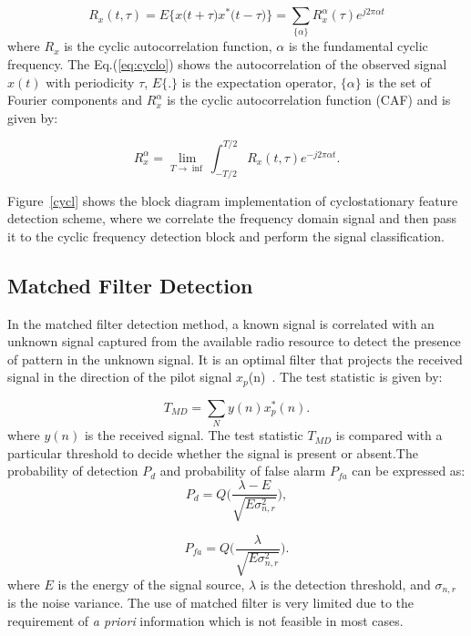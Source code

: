 \begin{equation}
\label{eq:cyclo}
R_x(t,\tau) = E\Bigg\{x\bigg(t+\tau \bigg)x^*\bigg(t-\tau \bigg)\Bigg\} = \sum_{\{\alpha\}} R_x^{\alpha}(\tau)e^{j2\pi\alpha t}
\end{equation}
where $R_x$ is the cyclic autocorrelation function, $\alpha$ is the fundamental cyclic frequency.
The Eq.(\ref{eq:cyclo}) shows the autocorrelation of the observed signal $x(t)$ with periodicity $\tau$, $E\{.\}$ is the expectation operator, $\{\alpha\}$ is the set of Fourier components and $R_x^{\alpha}$ is the cyclic autocorrelation function (CAF) and is given by:

\begin{equation}
R_x^{\alpha} = \lim_{T\rightarrow \inf}\int_{-T/2}^{T/2} R_x(t,\tau)e^{-j2\pi\alpha t}.
\end{equation}

Figure~\ref{cycl} shows the block diagram implementation of cyclostationary feature detection scheme, where we correlate the frequency domain signal and then pass it to the cyclic frequency detection block and perform the signal classification.

\subsection{Matched Filter Detection}

In the matched filter detection method, a known signal is correlated with an unknown signal captured from the available radio resource to detect the presence of pattern in the unknown signal. It is an optimal filter that projects the received signal in the direction of the pilot signal $x_p$(n)~\cite{weidling2005framework}. The test statistic is given by:

\begin{equation}
T_{MD} = \sum_N y(n)x^*_p(n).
\end{equation}
where $y(n)$ is the received signal. The test statistic $T_{MD}$ is compared with a particular threshold to decide whether the signal is present or absent.The probability of detection $P_d$ and probability of false alarm $P_{fa}$ can be expressed as:
\begin{equation}
P_d = Q\bigg(\dfrac{\lambda-E}{\sqrt{E\sigma_{n,r}^2}}\bigg),
\end{equation}

\begin{equation}
P_{fa} = Q\bigg(\dfrac{\lambda}{\sqrt{E\sigma_{n,r}^2}}\bigg).
\end{equation}
where $E$ is the energy of the signal source, $\lambda$ is the detection threshold, and $\sigma_{n,r}$ is the noise variance. The use of matched filter is very limited due to the requirement of \textit{a priori} information which is not feasible in most cases. 

